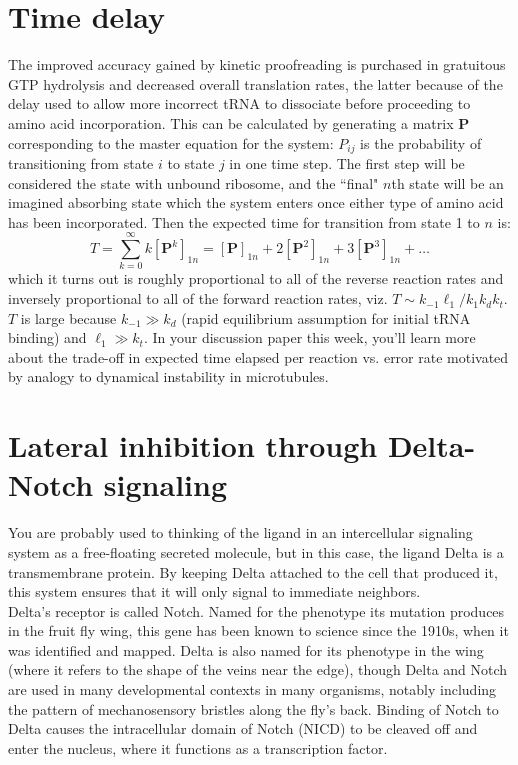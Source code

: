 \documentclass{article}
\begin{document}
\section*{Time delay}
The improved accuracy gained by kinetic proofreading is purchased in gratuitous GTP hydrolysis and decreased overall translation rates, the latter because of the delay used to allow more incorrect tRNA to dissociate before proceeding to amino acid incorporation. This can be calculated by generating a matrix $\mathbf{P}$ corresponding to the master equation for the system: $P_{ij}$ is the probability of transitioning from state $i$ to state $j$ in one time step. The first step will be considered the state with unbound ribosome, and the ``final" $n$th state will be an imagined absorbing state which the system enters once either type of amino acid has been incorporated. Then the expected time for transition from state 1 to $n$ is:
\[ T = \sum_{k=0}^{\infty} k \left[ \mathbf{P}^k \right]_{1n} = \left[ \mathbf{P} \right]_{1n} + 2 \left[ \mathbf{P}^2 \right]_{1n} + 3 \left[ \mathbf{P}^3 \right]_{1n} + \ldots \]
which it turns out is roughly proportional to all of the reverse reaction rates and inversely proportional to all of the forward reaction rates, viz. $T \sim k_{-1} \ell_1 / k_1k_dk_t$.$T$ is large because $k_{-1} \gg k_d$ (rapid equilibrium assumption for initial tRNA binding) and $\ell_1 \gg k_t$. In your discussion paper this week, you'll learn more about the trade-off in expected time elapsed per reaction vs. error rate motivated by analogy to dynamical instability in microtubules.

\section*{Lateral inhibition through Delta-Notch signaling}

You are probably used to thinking of the ligand in an intercellular signaling system as a free-floating secreted molecule, but in this case, the ligand Delta is a transmembrane protein. By keeping Delta attached to the cell that produced it, this system ensures that it will only signal to immediate neighbors.\\

Delta's receptor is called Notch. Named for the phenotype its mutation produces in the fruit fly wing, this gene has been known to science since the 1910s, when it was identified and mapped. Delta is also named for its phenotype in the wing (where it refers to the shape of the veins near the edge), though Delta and Notch are used in many developmental contexts in many organisms, notably including the pattern of mechanosensory bristles along the fly's back. Binding of Notch to Delta causes the intracellular domain of Notch (NICD) to be cleaved off and enter the nucleus, where it functions as a transcription factor.\\
\end{document}
